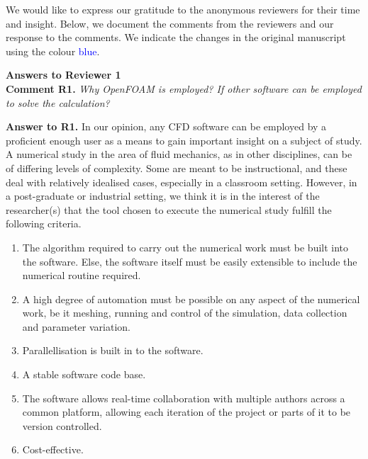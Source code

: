 \documentclass[12pt]{article}
\newcounter{question}
\newcommand{\name}{00}
\newcommand{\question}[1]{\refstepcounter{question} \noindent \textbf{Comment \name.\thequestion}\vskip 0.25cm \noindent \emph{#1}\\}
\newcommand{\answer}[1]{\noindent \textbf{Answer to \name.\thequestion}\vskip 0.25cm \noindent #1 \mbox{}\\}
\newcommand{\newperson}[2]{\renewcommand{\name}{#2} \setcounter{question}{0} \noindent \textbf{\large Answers to #1} \\}
\begin{document}
\noindent We would like to express our gratitude to the anonymous reviewers for their time and insight. Below, we document the comments from the reviewers and our response to the comments. We indicate the changes in the original manuscript using the colour \textcolor{blue}{blue}.

\vspace{1cm}

% 
% 
\newperson{Reviewer 1}{R1}

\question{Why OpenFOAM is employed? If other software can be employed to solve the calculation?} \label{quest:whyOF}

\answer{
  In our opinion, any CFD software can be employed by a proficient enough user as a means to gain important insight on a subject of study. A numerical study in the area of fluid mechanics, as in other disciplines, can be of differing levels of complexity. Some are meant to be instructional, and these deal with relatively idealised cases, especially in a classroom setting. However, in a post-graduate or industrial setting, we think it is in the interest of the researcher(s) that the tool chosen to execute the numerical study fulfill the following criteria.

    \begin{enumerate}
        \item The algorithm required to carry out the numerical work must be built into the software. Else, the software itself must be easily extensible to include the numerical routine required. \label{enum:extensible}
        \item A high degree of automation must be possible on any aspect of the numerical work, be it meshing, running and control of the simulation, data collection and parameter variation. \label{enum:automation}
        \item Parallellisation is built in to the software. \label{enum:parallellisation}
        \item A stable software code base. \label{enum:stability}
        \item The software allows real-time collaboration with multiple authors across a common platform, allowing each iteration of the project or parts of it to be version controlled. \label{enum:collaboration}
        \item Cost-effective. \label{enum:cost}
    \end{enumerate}

}
\end{document}
